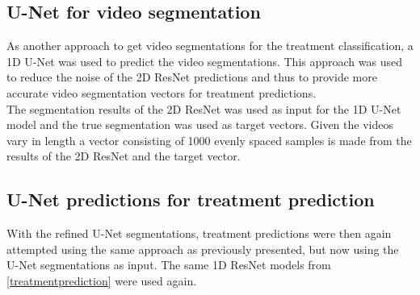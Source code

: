 \subsection{U-Net for video segmentation}
As another approach to get video segmentations for the treatment classification, a 1D U-Net was used to predict the video segmentations. This approach was used to reduce the noise of the 2D ResNet predictions and thus to provide more accurate video segmentation vectors for treatment predictions.\\ 
The segmentation results of the 2D ResNet was used as input for the 1D U-Net model and the true segmentation was used as target vectors. Given the videos vary in length a vector consisting of 1000 evenly spaced samples is made from the results of the 2D ResNet and the target vector.

\subsection{U-Net predictions for treatment prediction}
With the refined U-Net segmentations, treatment predictions were then again attempted using the same approach as previously presented, but now using the U-Net segmentations as input. The same 1D ResNet models from \autoref{treatmentprediction} were used again.
	